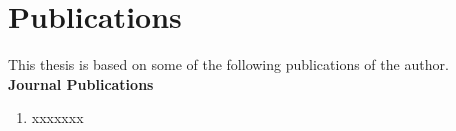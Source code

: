 \chapter*{Publications}
This thesis is based on some of the following publications of the author.\\

{\noindent \Large \textbf{Journal Publications}}
\begin{enumerate}
\item xxxxxxx
\end{enumerate}
